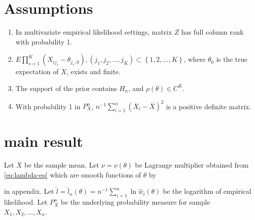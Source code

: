 \section{Assumptions}
\begin{enumerate}
\item \label{enu:multv-diff-full-rank}In multivariate empirical likelihood
settings, matrix $Z$ has full column rank with probability 1. %
\begin{comment}
brief discussion the stat meaning of assumption
\end{comment}

\item \label{enu:finite-moment-sample}$E\prod_{s=1}^{K}\left(X_{ij_{s}}-\theta_{j_{s},0}\right),\left(j_{1},j_{2},\ldots,j_{K}\right)\subset\left\{ 1,2,\ldots,K\right\} $,
where $\theta_{0}$ is the true expectation of $X$, exists and finite.
\begin{comment}
need a math induction lemma for finiteness of constant, need to be
more specified
\end{comment}
\begin{comment}
need a uniform bounded
\end{comment}

\item \label{enu:smooth-piror}The support of the prior contains $H_{n}$, and
$\rho\left(\theta\right)\in C^{K}$. 
\item \label{enu:pd-sample-var}With probability 1 in $P_{X}^{n}$, $n^{-1}\sum_{i=1}^{n}\left(X_{i}-\overline{X}\right)^{2}$
is a positive definite matrix. 
\end{enumerate}

\section{main result\label{sec:main-result}}

Let $\overline{X}$ be the sample mean. Let $\nu=\nu\left(\theta\right)$
be Lagrange multiplier obtained from \ref{eq:lambda-eq} which are
smooth functions of $\theta$ by %
\begin{comment}
smooth lemma
\end{comment}
{} in appendix. Let $\hat{l}=\hat{l}_{n}\left(\theta\right)=n^{-1}\sum_{i=1}^{n}\ln\hat{w}_{i}\left(\theta\right)$
be the logarithm of empirical likelihood. Let $P_{X}^{n}$ be the
underlying probability measure for sample $X_{1},X_{2},\ldots,X_{n}$. 

